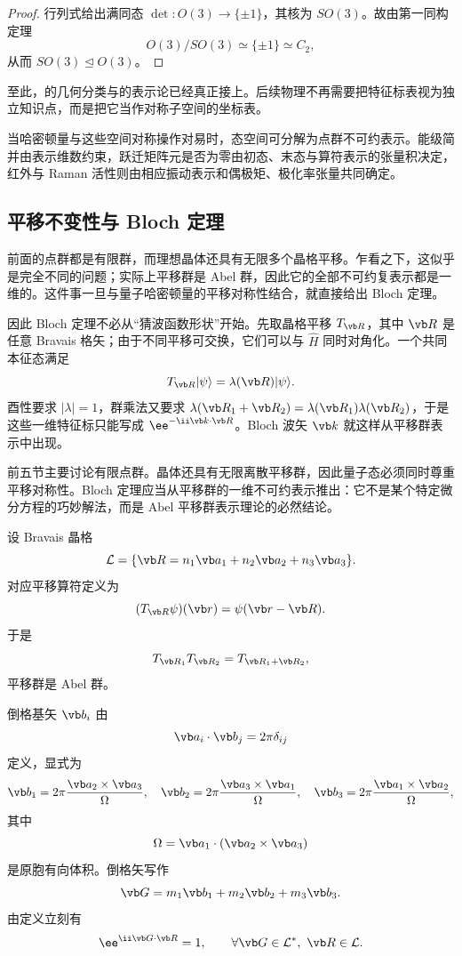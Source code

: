 \begin{proof}
行列式给出满同态 $\det:O(3)\to\{\pm1\}$，其核为 $SO(3)$。故由第一同构定理
\[
O(3)/SO(3)\simeq\{\pm1\}\simeq C_2,
\]
从而 $SO(3)\mathrel{\trianglelefteq} O(3)$。
\end{proof}


\par\medskip

至此，的几何分类与的表示论已经真正接上。后续物理不再需要把特征标表视为独立知识点，而是把它当作对称子空间的坐标表。

当哈密顿量与这些空间对称操作对易时，态空间可分解为点群不可约表示。能级简并由表示维数约束，跃迁矩阵元是否为零由初态、末态与算符表示的张量积决定，红外与 Raman 活性则由相应振动表示和偶极矩、极化率张量共同确定。

\subsection{平移不变性与 Bloch 定理}
\label{sec:translation-bloch}

前面的点群都是有限群，而理想晶体还具有无限多个晶格平移。乍看之下，这似乎是完全不同的问题；实际上平移群是 Abel 群，因此它的全部不可约复表示都是一维的。这件事一旦与量子哈密顿量的平移对称性结合，就直接给出 Bloch 定理。

因此 Bloch 定理不必从“猜波函数形状”开始。先取晶格平移 $T_{\vb R}$，其中 $\vb R$ 是任意 Bravais 格矢；由于不同平移可交换，它们可以与 $\hat H$ 同时对角化。一个共同本征态满足
\[
T_{\vb R}|\psi\rangle=\lambda(\vb R)|\psi\rangle.
\]
酉性要求 $|\lambda|=1$，群乘法又要求 $\lambda(\vb R_1+\vb R_2)=\lambda(\vb R_1)\lambda(\vb R_2)$，于是这些一维特征标只能写成 $\ee^{-\ii\vb k\cdot\vb R}$。Bloch 波矢 $\vb k$ 就这样从平移群表示中出现。

前五节主要讨论有限点群。晶体还具有无限离散平移群，因此量子态必须同时尊重平移对称性。Bloch 定理应当从平移群的一维不可约表示推出：它不是某个特定微分方程的巧妙解法，而是 Abel 平移群表示理论的必然结论。

设 Bravais 晶格
\[
\mathcal L
=\{\vb R=n_1\vb a_1+n_2\vb a_2+n_3\vb a_3\}.
\]
对应平移算符定义为
\[
(T_{\vb R}\psi)(\vb r)=\psi(\vb r-\vb R).
\label{eq:translation-operator}
\]
于是
\[
T_{\vb R_1}T_{\vb R_2}=T_{\vb R_1+\vb R_2},
\]
平移群是 Abel 群。

倒格基矢 $\vb b_i$ 由
\[
\vb a_i\cdot\vb b_j=2\pi\delta_{ij}
\]
定义，显式为
\[
\vb b_1=2\pi\frac{\vb a_2\times\vb a_3}{\Omega},
\quad
\vb b_2=2\pi\frac{\vb a_3\times\vb a_1}{\Omega},
\quad
\vb b_3=2\pi\frac{\vb a_1\times\vb a_2}{\Omega},
\]
其中
\[
\Omega=\vb a_1\cdot(\vb a_2\times\vb a_3)
\]
是原胞有向体积。倒格矢写作
\[
\vb G=m_1\vb b_1+m_2\vb b_2+m_3\vb b_3.
\]
由定义立刻有
\[
\ee^{\ii\vb G\cdot\vb R}=1,
\qquad
\forall\vb G\in\mathcal L^*,\ \vb R\in\mathcal L.
\]

